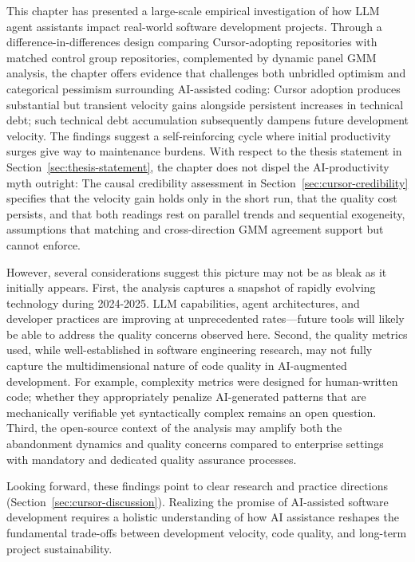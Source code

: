 This chapter has presented a large-scale empirical investigation of how LLM agent assistants impact real-world software development projects.
Through a difference-in-differences design comparing Cursor-adopting repositories with matched control group repositories, complemented by dynamic panel GMM analysis, the chapter offers evidence that challenges both unbridled optimism and categorical pessimism surrounding AI-assisted coding:
Cursor adoption produces substantial but transient velocity gains alongside persistent increases in technical debt; such technical debt accumulation subsequently dampens future development velocity.
The findings suggest a self-reinforcing cycle where initial productivity surges give way to maintenance burdens.
With respect to the thesis statement in Section~\ref{sec:thesis-statement}, the chapter does not dispel the AI-productivity myth outright: The causal credibility assessment in Section~\ref{sec:cursor-credibility} specifies that the velocity gain holds only in the short run, that the quality cost persists, and that both readings rest on parallel trends and sequential exogeneity, assumptions that matching and cross-direction GMM agreement support but cannot enforce.

However, several considerations suggest this picture may not be as bleak as it initially appears.
First, the analysis captures a snapshot of rapidly evolving technology during 2024-2025.
LLM capabilities, agent architectures, and developer practices are improving at unprecedented rates---future tools will likely be able to address the quality concerns observed here.
Second, the quality metrics used, while well-established in software engineering research, may not fully capture the multidimensional nature of code quality in AI-augmented development.
For example, complexity metrics were designed for human-written code; whether they appropriately penalize AI-generated patterns that are mechanically verifiable yet syntactically complex remains an open question.
Third, the open-source context of the analysis may amplify both the abandonment dynamics and quality concerns compared to enterprise settings with mandatory and dedicated quality assurance processes.

Looking forward, these findings point to clear research and practice directions (Section~\ref{sec:cursor-discussion}).
Realizing the promise of AI-assisted software development requires a holistic understanding of how AI assistance reshapes the fundamental trade-offs between development velocity, code quality, and long-term project sustainability.

